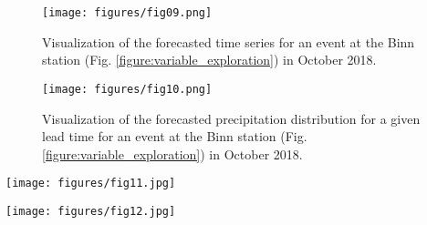 \documentclass[review]{elsarticle}
\begin{document}
\begin{figure}[t]
	\texttt{[image: figures/fig09.png]}
	\caption{Visualization of the forecasted time series for an event at the Binn station (Fig. \ref{figure:variable_exploration}) in October 2018.}
	\label{figure:atmoswing-viewer-timeseries}
\end{figure}

\begin{figure}[t]
	\texttt{[image: figures/fig10.png]}
	\caption{Visualization of the forecasted precipitation distribution for a given lead time for an event at the Binn station (Fig. \ref{figure:variable_exploration}) in October 2018.}
	\label{figure:atmoswing-viewer-distribution}
\end{figure}

\begin{figure*}[t]
	\texttt{[image: figures/fig11.jpg]}
	\caption{Example of parameters values for 2Z (Table \ref{table:methods}) for the precipitation at the Binn station (Fig. \ref{figure:variable_exploration}) on the period 2001--2010. The parameters are the extent (min/max longitude/latitude) of the spatial windows for the geopotential height at 500 and 1000~hPa, and the number of analogues. The location of the station is represented by the green vertical bar in the plots. The circles represent random parameters from the Monte--Carlo analysis. The plots are trunkated at the $25^{th}$ best percentiles of 50,000 realizations. Squares are the results of the sequential calibration and triangles result from genetic algorithms. Markers in blue represent parameters optimized for the period 1981--2000 and applied to 2001--2010. Markers in red represent parameters optimized directly for the period 2001--2010.}
	\label{figure:monte_carlo_r1}
\end{figure*}

\begin{figure*}[t]
	\texttt{[image: figures/fig12.jpg]}
	\caption{Same as Fig. \ref{figure:monte_carlo_r1} but for 2Z-2MI (Table \ref{table:methods}). Results are shown for both levels of analogy (geopotential height and moisture index).}
	\label{figure:monte_carlo_r2}
\end{figure*}

\clearpage
\end{document}
